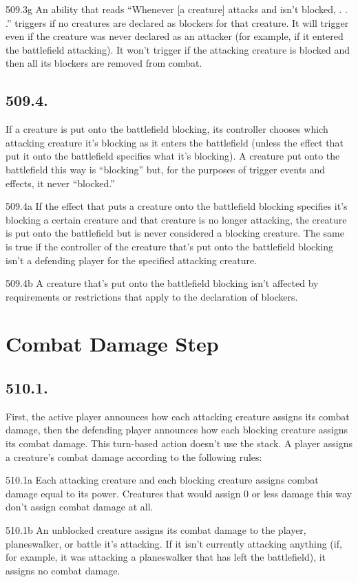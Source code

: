 509.3g An ability that reads “Whenever [a creature] attacks and isn’t blocked, . . .” triggers if no creatures are declared as blockers for that creature. It will trigger even if the creature was never declared as an attacker (for example, if it entered the battlefield attacking). It won’t trigger if the attacking creature is blocked and then all its blockers are removed from combat.

\subsection*{509.4.}
If a creature is put onto the battlefield blocking, its controller chooses which attacking creature it’s blocking as it enters the battlefield (unless the effect that put it onto the battlefield specifies what it’s blocking). A creature put onto the battlefield this way is “blocking” but, for the purposes of trigger events and effects, it never “blocked.”

509.4a If the effect that puts a creature onto the battlefield blocking specifies it’s blocking a certain creature and that creature is no longer attacking, the creature is put onto the battlefield but is never considered a blocking creature. The same is true if the controller of the creature that’s put onto the battlefield blocking isn’t a defending player for the specified attacking creature.

509.4b A creature that’s put onto the battlefield blocking isn’t affected by requirements or restrictions that apply to the declaration of blockers.

\section{Combat Damage Step}
\subsection*{510.1.}
First, the active player announces how each attacking creature assigns its combat damage, then the defending player announces how each blocking creature assigns its combat damage. This turn-based action doesn’t use the stack. A player assigns a creature’s combat damage according to the following rules:

510.1a Each attacking creature and each blocking creature assigns combat damage equal to its power. Creatures that would assign 0 or less damage this way don’t assign combat damage at all.

510.1b An unblocked creature assigns its combat damage to the player, planeswalker, or battle it’s attacking. If it isn’t currently attacking anything (if, for example, it was attacking a planeswalker that has left the battlefield), it assigns no combat damage.

